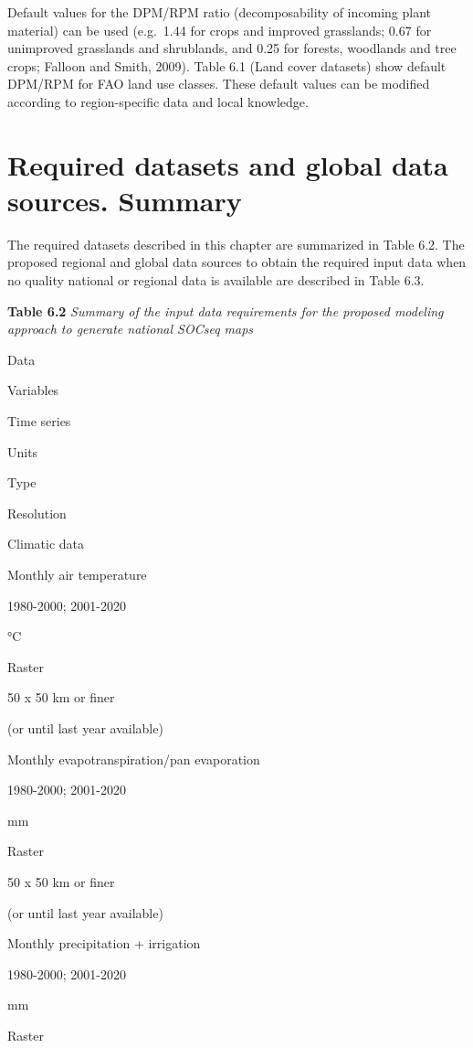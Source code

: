 \documentclass[
  10pt,
  b5paper,
]{book}
\begin{document}
Default values for the DPM/RPM ratio (decomposability of incoming plant material) can be used (e.g.~1.44 for crops and improved grasslands; 0.67 for unimproved grasslands and shrublands, and 0.25 for forests, woodlands and tree crops; Falloon and Smith, 2009). Table 6.1 (Land cover datasets) show default DPM/RPM for FAO land use classes. These default values can be modified according to region-specific data and local knowledge.

\hypertarget{required-datasets-and-global-data-sources.-summary}{%
\section{Required datasets and global data sources. Summary}\label{required-datasets-and-global-data-sources.-summary}}

The required datasets described in this chapter are summarized in Table 6.2. The proposed regional and global data sources to obtain the required input data when no quality national or regional data is available are described in Table 6.3.

\textbf{Table 6.2} \emph{Summary of the input data requirements for the proposed modeling approach to generate national SOCseq maps}

Data

Variables

Time series

Units

Type

Resolution

Climatic data

Monthly air temperature

1980-2000; 2001-2020

°C

Raster

50 x 50 km or finer

(or until last year available)

Monthly evapotranspiration/pan evaporation

1980-2000; 2001-2020

mm

Raster

50 x 50 km or finer

(or until last year available)

Monthly precipitation + irrigation

1980-2000; 2001-2020

mm

Raster
\end{document}
